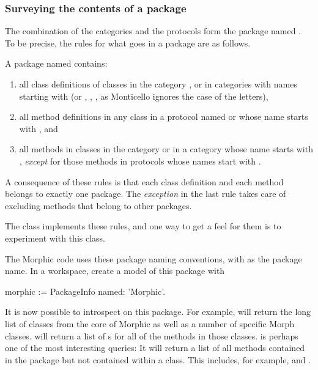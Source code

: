 \documentclass[a4paper,10pt,twoside]{book}
\begin{document}
\subsubsection{Surveying the contents of a package}

The combination of the  categories and the  protocols form the package named .
To be precise, the rules for what goes in a package are as follows.

A package named  contains:

\begin{enumerate}\label{sec:packageRules}
	\item{} all class definitions of classes in the category , or in categories with names starting with  (or , , \autc, as Monticello ignores the case of the letters),
	\item{} \label{env:extensions} all method definitions in any class in a protocol named  or whose name starts with ,
	and
	\item{} all methods in classes in the category  or in a category whose name starts with , \emph{except} for those methods in protocols whose names start with \prot{*}.
\end{enumerate}
\noindent
A consequence of these rules is that each class definition and each method belongs to exactly one package.
The \emph{exception} in the last rule takes care of excluding methods that belong to other packages.

The class  implements these rules, and one way to get a feel for them is to experiment with this class.


The Morphic code uses these package naming conventions, with  as the package name.
In a workspace, create a model of this package with

\begin{code}{}
morphic := PackageInfo named: 'Morphic'.
\end{code}

It is now possible to introspect on this package.
For example,  will return the long list of classes from the core of Morphic as well as a number of specific Morph classes.
 will return a list of s for all of the methods in those classes.
 is perhaps one of the most interesting queries:
It will return a list of all methods contained in the  package but not contained within a  class.
This includes, for example,  and .
\end{document}

